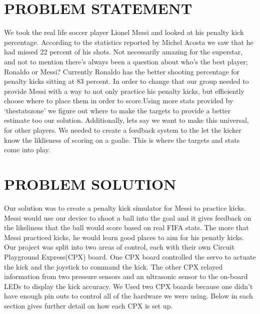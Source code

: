 \documentclass[12pt]{article}
\begin{document}
\section{PROBLEM STATEMENT}
We took the real life soccer player Lionel Messi and looked at his penalty kick percentage. According to the statistics reported by Michel Acosta\cite{michelacosta} we saw that he had missed 22 percent of his shots. Not necessarily amazing for the superstar, and not to mention there's always been a question about who's the best player; Ronaldo or Messi? Currently Ronaldo has the better shooting percentage for penalty kicks sitting at 83 percent. In order to change that our group needed to provide Messi with a way to not only practice his penalty kicks, but efficiently choose where to place them in order to score.Using more stats provided by `thestatszone'\cite{StatsZone.com} we figure out where to make the targets to provide a better estimate too our solution. Additionally, lets say we want to make this universal, for other players. We needed to create a feedback system to the let the kicker know the liklieness of scoring on a goalie. This is where the targets and stats come into play.

\section{PROBLEM SOLUTION}%


Our solution was to create a penalty kick simulator for Messi to practice kicks. Messi would use our device to shoot a ball into the goal and it gives feedback on the likeliness that the ball would score based on real FIFA stats. The more that Messi practiced kicks, he would learn good places to aim for his penatly kicks. Our project was split into two areas of control, each with their own Circuit Playground Express(CPX) board. One CPX board controlled the servo to actuate the kick and the joystick to command the kick. The other CPX relayed information from two pressure sensors and an ultrasonic sensor to the on-board LEDs to display the kick accuracy. We Used two CPX boards because one didn't have enough pin outs to control all of the hardware we were using. Below in each section gives further detail on how each CPX is set up. 
\end{document}
